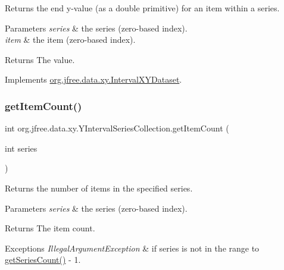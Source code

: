 Returns the end y-\/value (as a double primitive) for an item within a series.


\begin{DoxyParams}{Parameters}
{\em series} & the series (zero-\/based index). \\
\hline
{\em item} & the item (zero-\/based index).\\
\hline
\end{DoxyParams}
\begin{DoxyReturn}{Returns}
The value. 
\end{DoxyReturn}


Implements \mbox{\hyperlink{interfaceorg_1_1jfree_1_1data_1_1xy_1_1_interval_x_y_dataset_a0538ada774aad34ec95edbb84c1a82e1}{org.\+jfree.\+data.\+xy.\+Interval\+X\+Y\+Dataset}}.

\mbox{\label{classorg_1_1jfree_1_1data_1_1xy_1_1_y_interval_series_collection_a9a30e504b86b6ac333de0c3e34a3907d}} 
\subsubsection{\texorpdfstring{get\+Item\+Count()}{getItemCount()}}
{\footnotesize\ttfamily int org.\+jfree.\+data.\+xy.\+Y\+Interval\+Series\+Collection.\+get\+Item\+Count (\begin{DoxyParamCaption}\item[{int}]{series }\end{DoxyParamCaption})}

Returns the number of items in the specified series.


\begin{DoxyParams}{Parameters}
{\em series} & the series (zero-\/based index).\\
\hline
\end{DoxyParams}
\begin{DoxyReturn}{Returns}
The item count.
\end{DoxyReturn}

\begin{DoxyExceptions}{Exceptions}
{\em Illegal\+Argument\+Exception} & if {\ttfamily series} is not in the range {} to {\ttfamily \mbox{\hyperlink{classorg_1_1jfree_1_1data_1_1xy_1_1_y_interval_series_collection_ac7e43d8de0b3233231f55f21f865e242}{get\+Series\+Count()}} -\/ 1}. \\
\hline
\end{DoxyExceptions}


